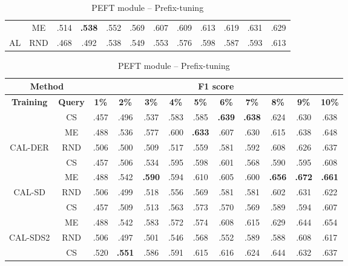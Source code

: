 \begin{table}[htbp]
\begin{subtable}{\linewidth}
\begin{tabular}{c|c|cccccccccc}
 & ME & .514 & \textbf{.538} & .552 & .569 & .607 & .609 & .613 & .619 & .631 & .629\\

\multirow{-3}{*}{\raggedright\arraybackslash AL} & RND & .468 & .492 & .538 & .549 & .553 & .576 & .598 & .587 & .593 & .613\\
\bottomrule
\end{tabular}
\end{subtable}
\vspace{1em}
\begin{subtable}{\linewidth}
\centering
\caption{PEFT module -- Prefix-tuning}

\begin{tabular}{c|c|cccccccccc}
\toprule
\multicolumn{2}{c|}{\textbf{Method}} & \multicolumn{10}{c}{\textbf{F1 score}} \\
\midrule
\textbf{Training} & \textbf{Query} & \textbf{1\%} & \textbf{2\%} & \textbf{3\%} & \textbf{4\%} & \textbf{5\%} & \textbf{6\%} & \textbf{7\%} & \textbf{8\%} & \textbf{9\%} & \textbf{10\%}\\
\midrule
 & CS & .457 & .496 & .537 & .583 & .585 & \textbf{.639} & \textbf{.638} & .624 & .630 & .638\\

 & ME & .488 & .536 & .577 & .600 & \textbf{.633} & .607 & .630 & .615 & .638 & .648\\

\multirow{-3}{*}{\raggedright\arraybackslash CAL-DER} & RND & .506 & .500 & .509 & .517 & .559 & .581 & .592 & .608 & .626 & .637\\
\midrule
 & CS & .457 & .506 & .534 & .595 & .598 & .601 & .568 & .590 & .595 & .608\\

 & ME & .488 & .542 & \textbf{.590} & .594 & .610 & .605 & .600 & \textbf{.656} & \textbf{.672} & \textbf{.661}\\

\multirow{-3}{*}{\raggedright\arraybackslash CAL-SD} & RND & .506 & .499 & .518 & .556 & .569 & .581 & .581 & .602 & .631 & .622\\
\midrule
 & CS & .457 & .509 & .513 & .563 & .573 & .570 & .569 & .589 & .594 & .607\\

 & ME & .488 & .542 & .583 & .572 & .574 & .608 & .615 & .629 & .644 & .654\\

\multirow{-3}{*}{\raggedright\arraybackslash CAL-SDS2} & RND & .506 & .497 & .501 & .546 & .568 & .552 & .589 & .588 & .608 & .617\\
\midrule
 & CS & .520 & \textbf{.551} & .586 & .591 & .615 & .616 & .624 & .644 & .632 & .637\\


\end{tabular}
\end{subtable}
\end{table}
